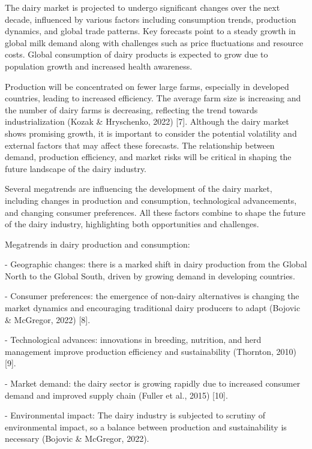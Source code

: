 \begin{multicols}{2}
The dairy market is projected to undergo significant changes over the
next decade, influenced by various factors including consumption trends,
production dynamics, and global trade patterns. Key forecasts point to a
steady growth in global milk demand along with challenges such as price
fluctuations and resource costs. Global consumption of dairy products is
expected to grow due to population growth and increased health
awareness.

Production will be concentrated on fewer large farms, especially in
developed countries, leading to increased efficiency. The average farm
size is increasing and the number of dairy farms is decreasing,
reflecting the trend towards industrialization (Kozak \& Hryschenko,
2022) {[}7{]}. Although the dairy market shows promising growth, it is
important to consider the potential volatility and external factors that
may affect these forecasts. The relationship between demand, production
efficiency, and market risks will be critical in shaping the future
landscape of the dairy industry.

Several megatrends are influencing the development of the dairy market,
including changes in production and consumption, technological
advancements, and changing consumer preferences. All these factors
combine to shape the future of the dairy industry, highlighting both
opportunities and challenges.

Megatrends in dairy production and consumption:

- Geographic changes: there is a marked shift in dairy production from
the Global North to the Global South, driven by growing demand in
developing countries.

- Consumer preferences: the emergence of non-dairy alternatives is
changing the market dynamics and encouraging traditional dairy producers
to adapt (Bojovic \& McGregor, 2022) {[}8{]}.

- Technological advances: innovations in breeding, nutrition, and herd
management improve production efficiency and sustainability (Thornton,
2010) {[}9{]}.

- Market demand: the dairy sector is growing rapidly due to increased
consumer demand and improved supply chain (Fuller et al., 2015)
{[}10{]}.

- Environmental impact: The dairy industry is subjected to scrutiny of
environmental impact, so a balance between production and sustainability
is necessary (Bojovic \& McGregor, 2022).


\end{multicols}

